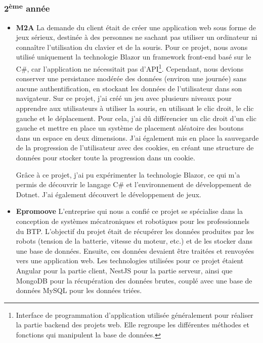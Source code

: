 \documentclass[12pt]{article}
\begin{document}
\subsubsection{2\textsuperscript{ème} année}
\begin{itemize}
    \item \textbf{M2A}
    \newline La demande du client était de créer une application web sous forme de jeux sérieux, destinée à des personnes ne sachant pas utiliser un ordinateur ni connaître l'utilisation du clavier et de la souris. Pour ce projet, nous avons utilisé uniquement la technologie Blazor un framework front-end basé sur le C\#, car l'application ne nécessitait pas d'API\footnote{Interface de programmation d'application utilisée généralement pour réaliser la partie backend des projets web. Elle regroupe les différentes méthodes et fonctions qui manipulent la base de données.}. Cependant, nous devions conserver une persistance modérée des données (environ une journée) sans aucune authentification, en stockant les données de l'utilisateur dans son navigateur.
    \newline  Sur ce projet, j'ai créé un jeu avec plusieurs niveaux pour apprendre aux utilisateurs à utiliser la souris, en utilisant le clic droit, le clic gauche et le déplacement. Pour cela, j'ai dû différencier un clic droit d'un clic gauche et mettre en place un système de placement aléatoire des boutons dans un espace en deux dimensions. J'ai également mis en place la sauvegarde de la progression de l'utilisateur avec des cookies, en créant une structure de données pour stocker toute la progression dans un cookie.

    \newline  Grâce à ce projet, j'ai pu expérimenter la technologie Blazor, ce qui m'a permis de découvrir le langage C\# et l'environnement de développement de Dotnet. J'ai également découvert le développement de jeux.

    \item \textbf{Epromoove}
     \newline L'entreprise qui nous a confié ce projet se spécialise dans la conception de systèmes mécatroniques et robotiques pour les professionnels du BTP. L'objectif du projet était de récupérer les données produites par les robots (tension de la batterie, vitesse du moteur, etc.) et de les stocker dans une base de données. Ensuite, ces données devaient être traitées et renvoyées vers une application web. Les technologies utilisées pour ce projet étaient Angular pour la partie client, NestJS pour la partie serveur, ainsi que MongoDB pour la récupération des données brutes, couplé avec une base de données MySQL pour les données triées.


\end{itemize}
\end{document}

